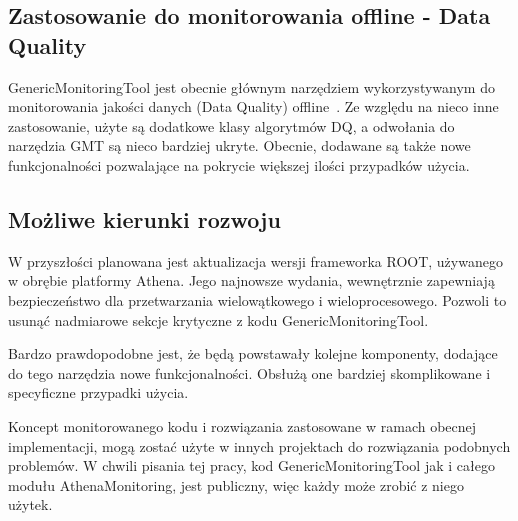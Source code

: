 \subsection{Zastosowanie do monitorowania offline - Data Quality}
GenericMonitoringTool jest obecnie głównym narzędziem wykorzystywanym do monitorowania jakości danych (Data Quality) offline~\cite{atlas-multithread-article}.
Ze względu na nieco inne zastosowanie, użyte są dodatkowe klasy algorytmów DQ, a odwołania do narzędzia GMT są nieco bardziej ukryte.
Obecnie, dodawane są także nowe funkcjonalności pozwalające na pokrycie większej ilości przypadków użycia.

\subsection{Możliwe kierunki rozwoju}
W przyszłości planowana jest aktualizacja wersji frameworka ROOT, używanego w obrębie platformy Athena.
Jego najnowsze wydania, wewnętrznie zapewniają bezpieczeństwo dla przetwarzania wielowątkowego i wieloprocesowego.
Pozwoli to usunąć nadmiarowe sekcje krytyczne z kodu GenericMonitoringTool.

Bardzo prawdopodobne jest, że będą powstawały kolejne komponenty, dodające do tego narzędzia nowe funkcjonalności.
Obsłużą one bardziej skomplikowane i specyficzne przypadki użycia.  

Koncept monitorowanego kodu i rozwiązania zastosowane w ramach obecnej implementacji, mogą zostać użyte w innych projektach do rozwiązania podobnych problemów.
W chwili pisania tej pracy, kod GenericMonitoringTool jak i całego modułu AthenaMonitoring, jest publiczny, więc każdy może zrobić z niego użytek. 

